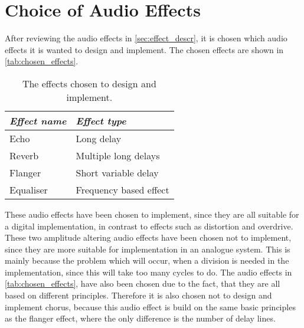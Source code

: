 \section{Choice of Audio Effects}\label{sec:choice_effects}
After reviewing the audio effects in \autoref{sec:effect_descr}, it is chosen which audio effects it is wanted to design and implement. The chosen effects are shown in \autoref{tab:chosen_effects}.

\begin{table}[httb!]
	\centering
	\caption{The effects chosen to design and implement.}
	\label{tab:chosen_effects}
	\begin{threeparttable}
		\begin{tabularx}{\textwidth}{X X}
			\textit{Effect name} & \textit{Effect type}\\ \toprule \rowcolor{lightGrey}
			Echo & Long delay \\
			Reverb & Multiple long delays \\ 
			\rowcolor{lightGrey}
			Flanger & Short variable delay \\
			Equaliser & Frequency based effect \\
		\end{tabularx}
	\end{threeparttable}
\end{table}

These audio effects have been chosen to implement, since they are all suitable for a digital implementation, in contrast to effects such as distortion and overdrive. These two amplitude altering audio effects have been chosen not to implement, since they are more suitable for implementation in an analogue system. This is mainly because the problem which will occur, when a division is needed in the implementation, since this will take too many cycles to do. 
The audio effects in \autoref{tab:chosen_effects}, have also been chosen due to the fact, that they are all based on different principles. Therefore it is also chosen not to design and implement chorus, because this audio effect is build on the same basic principles as the flanger effect, where the only difference is the number of delay lines.
